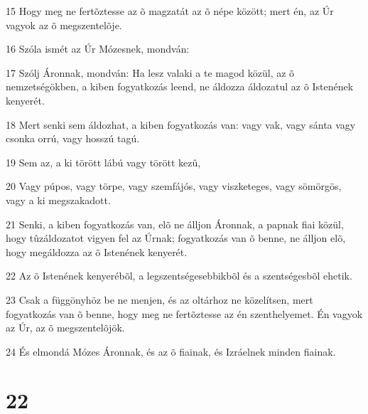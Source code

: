 \par 15 Hogy meg ne fertõztesse az õ magzatát az õ népe között; mert én, az Úr vagyok az õ megszentelõje.
\par 16 Szóla ismét az Úr Mózesnek, mondván:
\par 17 Szólj Áronnak, mondván: Ha lesz valaki a te magod közül, az õ nemzetségökben, a kiben fogyatkozás leend, ne áldozza áldozatul az õ Istenének kenyerét.
\par 18 Mert senki sem áldozhat, a kiben fogyatkozás van: vagy vak, vagy sánta vagy csonka orrú, vagy hosszú tagú.
\par 19 Sem az, a ki törött lábú vagy törött kezû,
\par 20 Vagy púpos, vagy törpe, vagy szemfájós, vagy viszketeges, vagy sömörgös, vagy a ki megszakadott.
\par 21 Senki, a kiben fogyatkozás van, elõ ne álljon Áronnak, a papnak fiai közül, hogy tûzáldozatot vigyen fel az Úrnak; fogyatkozás van õ benne, ne álljon elõ, hogy megáldozza az õ Istenének kenyerét.
\par 22 Az õ Istenének kenyerébõl, a legszentségesebbikbõl és a szentségesbõl ehetik.
\par 23 Csak a függönyhöz be ne menjen, és az oltárhoz ne közelítsen, mert fogyatkozás van õ benne, hogy meg ne fertõztesse az én szenthelyemet. Én vagyok az Úr, az õ megszentelõjök.
\par 24 És elmondá Mózes Áronnak, és az õ fiainak, és Izráelnek minden fiainak.

\chapter{22}

